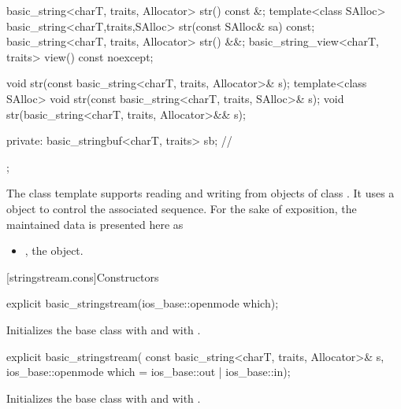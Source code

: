\begin{codeblock}
{{    basic_string<charT, traits, Allocator> str() const &;
    template<class SAlloc>
      basic_string<charT,traits,SAlloc> str(const SAlloc& sa) const;
    basic_string<charT, traits, Allocator> str() &&;
    basic_string_view<charT, traits> view() const noexcept;

    void str(const basic_string<charT, traits, Allocator>& s);
    template<class SAlloc>
      void str(const basic_string<charT, traits, SAlloc>& s);
    void str(basic_string<charT, traits, Allocator>&& s);

  private:
    basic_stringbuf<charT, traits> sb;  // \expos
  };
}
\end{codeblock}

\pnum
The
class template
supports reading and writing from objects of class
.
It uses a
object to control the associated sequence.
For the sake of exposition, the maintained data is presented here as
\begin{itemize}
\item
{}, the  object.
\end{itemize}

[stringstream.cons]{Constructors}

%
\begin{itemdecl}
explicit basic_stringstream(ios_base::openmode which);
\end{itemdecl}

\begin{itemdescr}
\pnum
\effects
Initializes the base class with
and
with
.
\end{itemdescr}

%
\begin{itemdecl}
explicit basic_stringstream(
  const basic_string<charT, traits, Allocator>& s,
  ios_base::openmode which = ios_base::out | ios_base::in);
\end{itemdecl}

\begin{itemdescr}
\pnum
\effects
Initializes the base class with
and
with
.
\end{itemdescr}

